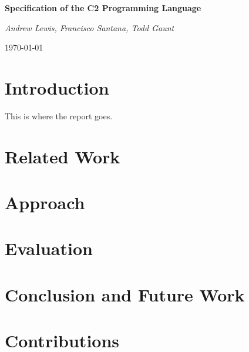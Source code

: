 \documentclass[10pt,a4paper]{article}
\begin{document}
\begin{center}
  {\huge\bfseries Specification of the C2 Programming Language\par}
  \vspace{1cm}
  {\Large\itshape Andrew Lewis, Francisco Santana, Todd Gaunt\par}
  \vspace{0.5cm}
  {\large\today\par}
\end{center}

\section{Introduction}
This is where the report goes.
\section{Related Work}
\section{Approach}
\section{Evaluation}
\section{Conclusion and Future Work}
\section{Contributions}
\end{document}
